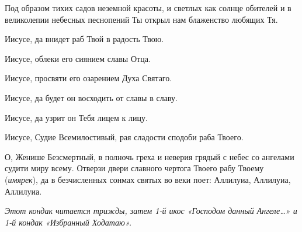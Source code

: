 \begin{mymulticols}


Под образом тихих садов неземной красоты, и светлых как солнце обителей и в великолепии небесных песнопений Ты открыл нам блаженство любящих Тя. 

Иисусе, да внидет раб Твой в радость Твою. 

Иисусе, облеки его сиянием славы Отца. 

Иисусе, просвяти его озарением Духа Святаго. 

Иисусе, да будет он восходить от славы в славу. 

Иисусе, да узрит он Тебя лицем к лицу. 

Иисусе, Судие Всемилостивый, рая сладости сподоби раба Твоего.




О, Женише Безсмертный, в полночь греха и неверия грядый с небес со ангелами судити миру всему. Отверзи двери славного чертога Твоего рабу Твоему ({\itshape имярек}), да в безчисленных сонмах святых во веки поет: Аллилуиа, Аллилуиа, Аллилуиа. 

{\itshape Этот кондак читается трижды, затем 1-й икос «Господом данный Ангеле…» и 1-й кондак «Избранный Ходатаю».}

\end{mymulticols}

\mychapterending


